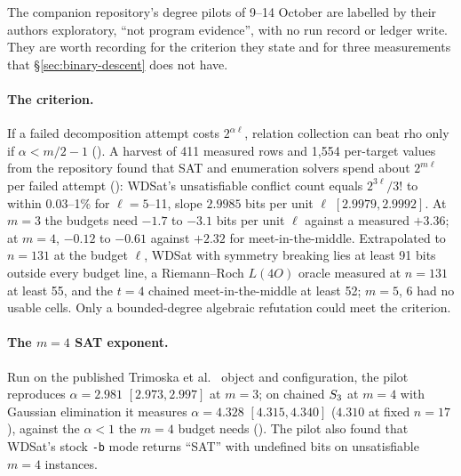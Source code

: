 The companion repository's degree pilots of 9--14 October are labelled by
their authors exploratory, ``not program evidence'', with no run record or
ledger write. They are worth recording for the criterion they state and for
three measurements that \S\ref{sec:binary-descent} does not have.

\paragraph{The criterion.} If a failed decomposition attempt costs
$2^{\alpha\ell}$, relation collection can beat rho only if $\alpha<m/2-1$
().
A harvest of 411 measured rows and 1{,}554 per-target values from the
repository found that SAT and enumeration solvers spend about $2^{m\ell}$
per failed attempt
():
WDSat's unsatisfiable conflict count equals $2^{3\ell}/3!$ to within
0.03--1\% for $\ell=5$--11, slope $2.9985$ bits per unit $\ell$
$[2.9979,2.9992]$. At $m=3$ the budgets need $-1.7$ to $-3.1$ bits per unit
$\ell$ against a measured $+3.36$; at $m=4$, $-0.12$ to $-0.61$ against
$+2.32$ for meet-in-the-middle. Extrapolated to $n=131$ at the budget
$\ell$, WDSat with symmetry breaking lies at least 91 bits outside every
budget line, a Riemann--Roch $L(4O)$ oracle measured at $n=131$ at least
55, and the $t=4$ chained meet-in-the-middle at least 52; $m=5$, 6 had no
usable cells. Only a bounded-degree algebraic refutation could meet the
criterion.

\paragraph{The $m=4$ SAT exponent.} Run on the published
Trimoska et al.~\cite{trimoska2020} object and configuration, the pilot
reproduces $\alpha=2.981$ $[2.973,2.997]$ at $m=3$; on chained $S_{3}$ at
$m=4$ with Gaussian elimination it measures $\alpha=4.328$
$[4.315,4.340]$ ($4.310$ at fixed $n=17$), against the $\alpha<1$ the $m=4$
budget needs
().
The pilot also found that WDSat's stock \texttt{-b} mode returns ``SAT'' with
undefined bits on unsatisfiable $m=4$ instances.

